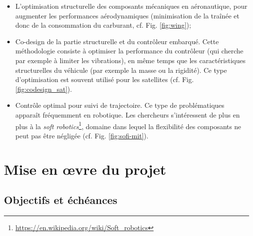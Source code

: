 \documentclass[12pt, french]{article}
\begin{document}
	\begin{itemize}
		\item L'optimisation structurelle des composants mécaniques en aéronautique, pour augmenter les performances aérodynamiques (minimisation de la traînée et donc de la consommation du carburant, cf. Fig. \ref{fig:wing}); 
		\item Co-design de la partie structurelle et du contrôleur embarqué. Cette méthodologie consiste à optimiser la performance du contrôleur (qui cherche par exemple à limiter les vibrations), en même temps que les caractéristiques structurelles du véhicule (par exemple la masse ou la rigidité). Ce type d'optimisation est souvent utilisé pour les satellites (cf. Fig. \ref{fig:codesign_sat}).
		\item Contrôle optimal pour suivi de trajectoire. Ce type de problématiques apparaît fréquemment en robotique.
		\newline
		Les chercheurs s'intéressent de plus en plus à la \textit{soft robotics}\footnote{\url{https://en.wikipedia.org/wiki/Soft_robotics}}, domaine dans lequel la flexibilité des composants ne peut pas être négligée (cf. Fig. \ref{fig:sofi-mit}).
	\end{itemize}
	
	
	\section{Mise en \oe{}vre du projet}
	
	\subsection{Objectifs et échéances}
	
\end{document}
